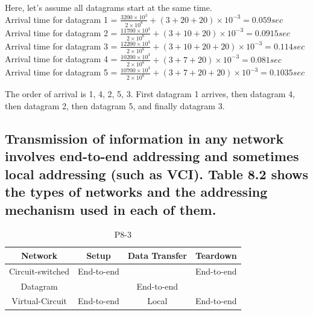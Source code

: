 \documentclass{article}
\begin{document}
Here, let's assume all datagrams start at the same time. \\
Arrival time for datagram 1 = $ \frac{3200 \times 10^3}{2 \times 10^8} + (3 + 20 + 20) \times 10^{-3} = 0.059 sec $ \\
Arrival time for datagram 2 = $ \frac{11700 \times 10^3}{2 \times 10^8} + (3 + 10 + 20) \times 10^{-3} = 0.0915 sec $ \\
Arrival time for datagram 3 = $ \frac{12200 \times 10^3}{2 \times 10^8} + (3 + 10 + 20 + 20) \times 10^{-3} = 0.114 sec $ \\
Arrival time for datagram 4 = $ \frac{10200 \times 10^3}{2 \times 10^8} + (3 + 7 + 20) \times 10^{-3} = 0.081 sec $ \\
Arrival time for datagram 5 = $ \frac{10700 \times 10^3}{2 \times 10^8} + (3 + 7 + 20 + 20) \times 10^{-3} = 0.1035 sec $ \par
The order of arrival is 1, 4, 2, 5, 3. First datagram 1 arrives, then datagram 4, then datagram 2, then datagram 5, and finally datagram 3. \par

\subsection{
	Transmission of information in any network involves end-to-end addressing
	and sometimes local addressing (such as VCI). Table 8.2 shows the types of
	networks and the addressing mechanism used in each of them.
}
\begin{table}[H]
	\centering
	\begin{tabular}{ | c | c | c | c | }
		\hline
		Network          & Setup      & Data Transfer & Teardown   \\
		\hline
		Circuit-switched & End-to-end &               & End-to-end \\
		\hline
		Datagram         &            & End-to-end    &            \\
		\hline
		Virtual-Circuit  & End-to-end & Local         & End-to-end \\
		\hline
	\end{tabular}
	\caption{P8-3}
	\label{table:2}
\end{table}
\end{document}
